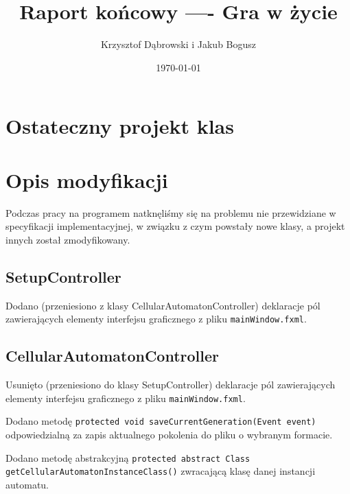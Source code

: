 \documentclass{mwart}
\title{Raport końcowy ---- Gra w życie}
\author{Krzysztof Dąbrowski i Jakub Bogusz}
\date{\today}
\begin{document}
\maketitle{}

\tableofcontents{}

\section{Ostateczny projekt klas}

\section{Opis modyfikacji}
Podczas pracy na programem natknęliśmy się na problemu nie przewidziane w specyfikacji implementacyjnej, w związku z czym powstały nowe klasy, a projekt innych został zmodyfikowany.

\subsection{SetupController}
Dodano (przeniesiono z klasy CellularAutomatonController) deklaracje pól zawierających elementy interfejsu graficznego z pliku \texttt{mainWindow.fxml}.

\subsection{CellularAutomatonController}
Usunięto (przeniesiono do klasy SetupController) deklaracje pól zawierających elementy interfejsu graficznego z pliku \texttt{mainWindow.fxml}.

Dodano metodę \texttt{protected void saveCurrentGeneration(Event event)} odpowiedzialną za zapis aktualnego pokolenia do pliku o wybranym formacie.

Dodano metodę abstrakcyjną \texttt{protected abstract Class getCellularAutomatonInstanceClass()} zwracającą klasę danej instancji automatu.\\
\end{document}
